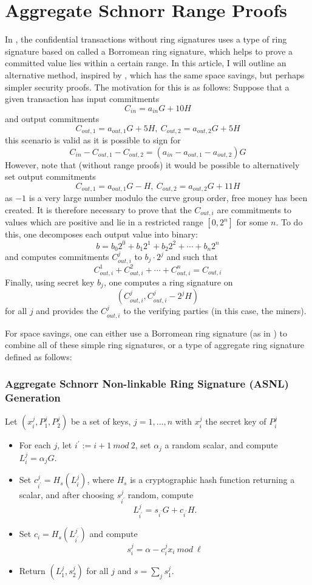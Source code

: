 \documentclass[12pt,english]{mrl}
\theoremstyle{definition}
\numberwithin{equation}{section}
\numberwithin{figure}{section}
\numberwithin{equation}{section}
\numberwithin{equation}{section}
\numberwithin{figure}{section}
\begin{document}
\section{Aggregate Schnorr Range Proofs}
\label{AgSchnorr}
In \cite{GM}, the confidential transactions without ring signatures uses a type of ring signature based on \cite{abe} called a Borromean ring signature, which helps to prove a committed value lies within a certain range. In this article, I will outline an alternative method, inspired by \cite{herranz}, which has the same space savings, but perhaps simpler security proofs. The motivation for this is as follows: Suppose that a given transaction has input commitments
\[
 C_{in} = a_{in} G + 10 H
\]
and output commitments
\[
 C_{out,1} = a_{out,1} G + 5 H,\ C_{out,2} = a_{out,2} G + 5 H
\]
this scenario is valid as it is possible to sign for 
\[
 C_{in} - C_{out,1} - C_{out,2} = \left(a_{in} - a_{out,1} - a_{out,2} \right) G
\]
However, note that (without range proofs) it would be possible to alternatively set output commitments
\[ 
  C_{out,1} = a_{out,1} G - H,\ C_{out,2} = a_{out,2} G + 11 H
\]
as $-1$ is a very large number modulo the curve group order, free money has been created. It is therefore necessary to prove that the $C_{out,i}$ are commitments to values which are positive and lie in a restricted range $[0,2^n]$ for some $n$.
To do this, one decomposes each output value into binary:
\[
 b = b_0 2^0 + b_1 2^1 + b_2 2^2 + \cdots + b_n 2^n
\]
and computes commitments $C_{out,i}^j$ to $b_j \cdot 2^j $ and such that 
\[
 C_{out,i}^1 + C_{out,i}^2 + \cdots + C_{out,i}^n = C_{out,i}
\]
Finally, using secret key $b_j$, one computes a ring signature on 
\[
 (C_{out,i}^j, C_{out,i}^j - 2^j H)
\]
for all $j$ and provides the $C_{out,i}^j$ to the verifying parties (in this case, the miners). 

For space savings, one can either use a Borromean ring signature (as in \cite{GM}) to combine all of these simple ring signatures, or a type of aggregate ring signature defined as follows:
\subsubsection{ Aggregate Schnorr Non-linkable Ring Signature (ASNL) Generation} 
Let $(x_i^j, P_1^j, P_2^j)$ be a set of keys, $j=1,...,n$ with $x_i^j$ the secret key of $P_i^j$
\begin{itemize}
 \item For each $j$, let $i^\prime := i+1\  mod\  2$, set $\alpha_j$ a random scalar, and compute $L_i^j = \alpha_j G$. 
 \item Set $c_{i^\prime}^j= H_s(L_i^j)$, where $H_s$ is a cryptographic hash function returning a scalar, and after choosing $s_{i^\prime}^j$ random, compute
 \[
L_{i^\prime}^j = s_{i^\prime} G + c_{i^\prime} H. 
 \]
 \item Set $c_i = H_s(L_{i^\prime}^j)$ and compute
 \[
 s_i^j = \alpha - c_i^j x_i \ mod\ \ell 
 \]
 \item Return $(L_1^j, s_2^j)$ for all $j$ and $s = \sum_j s_1^j$. 
\end{itemize}
\end{document}
